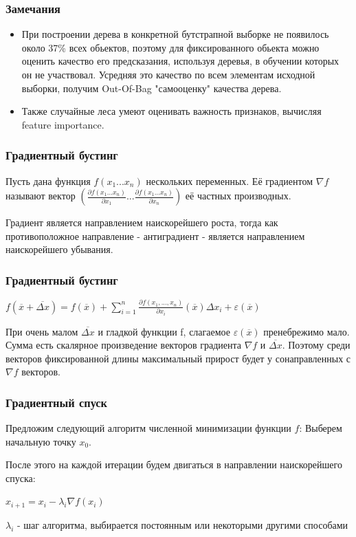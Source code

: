 \documentclass[14pt]{beamer}
\begin{document}
\begin{frame}
\frametitle{Замечания}
        \begin{itemize}
            \item При построении дерева в конкретной бутстрапной выборке не появилось около 37\% всех обьектов, поэтому для фиксированного обьекта можно оценить качество его предсказания, используя деревья, в обучении которых он не участвовал. Усредняя это качество по всем элементам исходной выборки, получим Out-Of-Bag "самооценку" качества дерева. 
            \item Также случайные леса умеют оценивать важность признаков, вычисляя feature importance.
        \end{itemize}
\end{frame}

\begin{frame}
\frametitle{Градиентный бустинг}
        \begin{rudef}
            Пусть дана функция $f(x_1...x_n)$ нескольких переменных. Её градиентом $\nabla f$ называют вектор $(\frac{\partial f(x_1...x_n)}{\partial x_1} ... \frac{\partial f(x_1...x_n)}{\partial x_n})$ её частных производных.
        \end{rudef}
        
        Градиент является направлением наискорейшего роста, тогда как противоположное направление - антиградиент - является направлением наискорейшего убывания. 
        
        
\end{frame}

\begin{frame}
\frametitle{Градиентный бустинг}
        $f(\overline{x} + \overline{\Delta x}) = f(\overline{x}) + \sum\limits_{i=1}^{n} \frac{\partial f(x_1, ..., x_n)}{\partial x_i} (\overline{x}) \Delta x_i + \varepsilon(\overline{x})$
        
        При очень малом $\overline{\Delta x}$ и гладкой функции f, слагаемое $\varepsilon(\overline{x})$ пренебрежимо мало. Сумма есть скалярное произведение векторов градиента $\nabla f$ и $\overline{\Delta x}$. Поэтому среди векторов фиксированной длины максимальный прирост будет у сонаправленных с  $\nabla f$ векторов.
        
\end{frame}


\begin{frame}
\frametitle{Градиентный спуск}
        Предложим следующий алгоритм численной минимизации функции $f$:
        Выберем начальную точку $x_0$. 
        
        После этого на каждой итерации будем двигаться в направлении наискорейшего спуска:
        
        $x_{i+1} = x_{i} - \lambda_i \nabla f (x_i{})$
        
        $\lambda_i$ - шаг алгоритма, выбирается постоянным или некоторыми другими способами
\end{frame}
\end{document}
